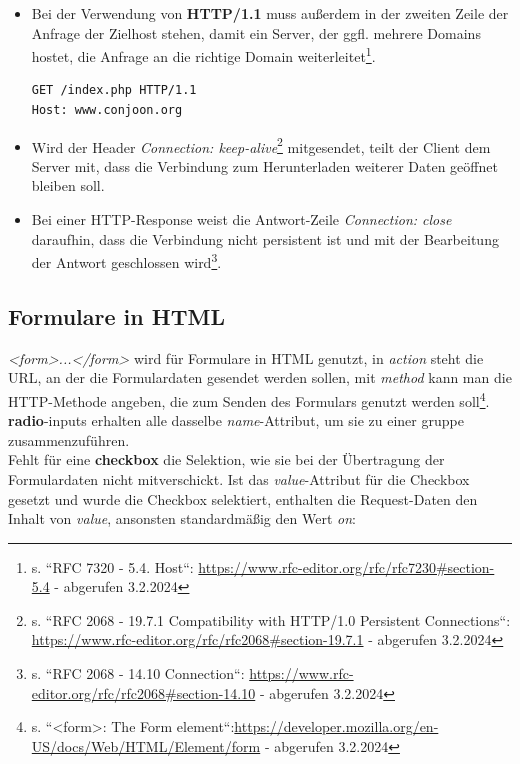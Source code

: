 \begin{itemize}
    \item Bei der Verwendung von \textbf{HTTP/1.1} muss außerdem in der zweiten Zeile der Anfrage der Zielhost stehen, damit ein Server, der {ggfl.} mehrere Domains hostet, die Anfrage an die richtige Domain weiterleitet\footnote{s. ``RFC 7320 - 5.4.  Host``: \url{https://www.rfc-editor.org/rfc/rfc7230#section-5.4} - abgerufen 3.2.2024}.
    \begin{verbatim}
GET /index.php HTTP/1.1
Host: www.conjoon.org
    \end{verbatim}
    \item Wird der Header \textit{Connection: keep-alive}\footnote{
    s. ``RFC 2068 - 19.7.1 Compatibility with HTTP/1.0 Persistent Connections``: \url{https://www.rfc-editor.org/rfc/rfc2068#section-19.7.1} - abgerufen 3.2.2024
    } mitgesendet, teilt der Client dem Server mit, dass die Verbindung zum Herunterladen weiterer Daten geöffnet bleiben soll.
    \item Bei einer HTTP-Response weist die Antwort-Zeile \textit{Connection: close} daraufhin, dass die Verbindung nicht persistent ist und mit der Bearbeitung der Antwort geschlossen wird\footnote{
    s. ``RFC 2068 - 14.10 Connection``: \url{https://www.rfc-editor.org/rfc/rfc2068#section-14.10} - abgerufen 3.2.2024
    }.
\end{itemize}

\subsection{Formulare in HTML}

\textit{<form>...</form>} wird für Formulare in HTML genutzt, in \textit{action} steht die URL, an der die Formulardaten gesendet werden sollen, mit \textit{method} kann man die HTTP-Methode angeben, die zum Senden des Formulars genutzt werden soll\footnote{
s. ``<form>: The Form element``:\url{https://developer.mozilla.org/en-US/docs/Web/HTML/Element/form} - abgerufen 3.2.2024
}.\\

\noindent
\textbf{radio}-inputs erhalten alle dasselbe \textit{name}-Attribut, um sie zu einer gruppe zusammenzuführen.\\

\noindent
Fehlt für eine \textbf{checkbox} die Selektion, wie sie bei der Übertragung der Formulardaten nicht mitverschickt.
Ist das \textit{value}-Attribut für die Checkbox gesetzt und wurde die Checkbox selektiert, enthalten die Request-Daten den Inhalt von \textit{value}, ansonsten standardmäßig den Wert \textit{on}:


